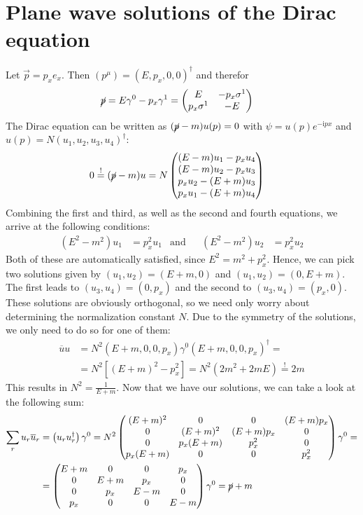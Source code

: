 \documentclass[english, parskip=full]{scrartcl}
\newcommand{\kla}{}
\newcommand{\klam}{}
\newcommand{\tecxt}{}
\def\I{\text{i}}
\begin{document}
\section{Plane wave solutions of the Dirac equation}
Let $\vec{p}=p_xe_x$. Then $(p^\mu)=(E,p_x,0,0)^\dagger$ and therefor
\begin{align*}
\cancel{p}&=E\gamma^0-p_x\gamma^1=\begin{pmatrix}
E&-p_x\sigma^1 \\ p_x\sigma^1 & -E
\end{pmatrix}
\end{align*}
The Dirac equation can be written as $(\cancel{p}-m)u(p)=0$ with $\psi=u(p)e^{-\I px}$ and $u(p)=N(u_1,u_2,u_3,u_4)^\dagger$:
\begin{align*}
0&\overset{!}{=}(\cancel{p}-m)u =N\begin{pmatrix}
(E-m)u_1-p_xu_4 \\
(E-m)u_2-p_xu_3 \\
p_xu_2-(E+m)u_3 \\
p_xu_1-(E+m)u_4
\end{pmatrix}
\end{align*}
Combining the first and third, as well as the second and fourth equations, we arrive at the following conditions:
\begin{align*}
(E^2-m^2)u_1&=p_x^2u_1&\tecxt\text{and}&&(E^2-m^2)u_2&=p_x^2u_2
\end{align*}
Both of these are automatically satisfied, since $E^2=m^2+p_x^2$. Hence, we can pick two solutions given by $(u_1,u_2)=(E+m,0)$ and $(u_1,u_2)=(0,E+m)$. The first leads to $(u_3,u_4)=(0,p_x)$ and the second to $(u_3,u_4)=(p_x,0)$. These solutions are obviously orthogonal, so we need only worry about determining the normalization constant $N$. Due to the symmetry of the solutions, we only need to do so for one of them:
\begin{align*}
\overline{u}u&=N^2(E+m,0,0,p_x)\gamma^0(E+m,0,0,p_x)^\dagger =\\
&= N^2\klam\left[ {\kla\left( {E+m} \right)^2-p_x^2} \right]=N^2(2m^2+2mE)\overset{!}{=}2m
\end{align*}
This results in $N^2=\frac{1}{E+m}$. Now that we have our solutions, we can take a look at the following sum:
\begin{align*}
\sum_ru_r\overline{u}_r&=\kla\left( {u_ru_r^\dagger} \right)\gamma^0=N^2\begin{pmatrix}
(E+m)^2&0&0&(E+m)p_x \\
0&(E+m)^2&(E+m)p_x&0 \\ 0&p_x(E+m)&p_x^2&0 \\ p_x(E+m)&0&0&p_x^2
\end{pmatrix}\gamma^0=\\
&=\begin{pmatrix}
E+m&0&0&p_x \\ 0&E+m&p_x&0 \\ 0&p_x&E-m&0 \\p_x&0&0&E-m
\end{pmatrix}\gamma^0=\cancel{p}+m 
\end{align*}
\end{document}
